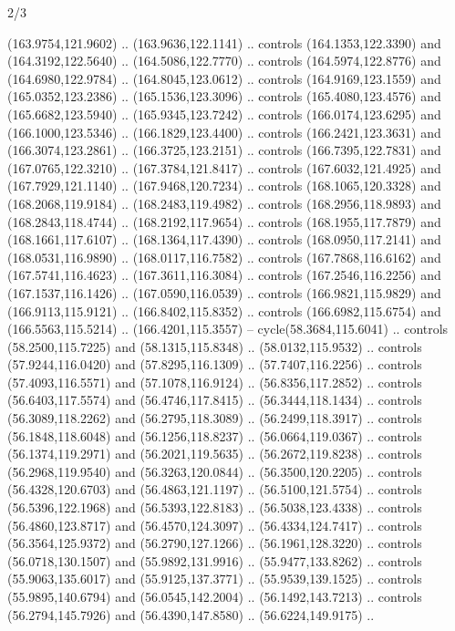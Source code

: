 \begin{flagdescription}{2/3}
\begin{scope}[shift={(0.5\flaglength,0.5)},scale=\flagwidth/320]
\begin{scope}[y=0.8pt, x=0.8pt, yscale=-1,shift={(-118.3,-146)}]
  (163.9754,121.9602) .. (163.9636,122.1141) .. controls (164.1353,122.3390) and
  (164.3192,122.5640) .. (164.5086,122.7770) .. controls (164.5974,122.8776) and
  (164.6980,122.9784) .. (164.8045,123.0612) .. controls (164.9169,123.1559) and
  (165.0352,123.2386) .. (165.1536,123.3096) .. controls (165.4080,123.4576) and
  (165.6682,123.5940) .. (165.9345,123.7242) .. controls (166.0174,123.6295) and
  (166.1000,123.5346) .. (166.1829,123.4400) .. controls (166.2421,123.3631) and
  (166.3074,123.2861) .. (166.3725,123.2151) .. controls (166.7395,122.7831) and
  (167.0765,122.3210) .. (167.3784,121.8417) .. controls (167.6032,121.4925) and
  (167.7929,121.1140) .. (167.9468,120.7234) .. controls (168.1065,120.3328) and
  (168.2068,119.9184) .. (168.2483,119.4982) .. controls (168.2956,118.9893) and
  (168.2843,118.4744) .. (168.2192,117.9654) .. controls (168.1955,117.7879) and
  (168.1661,117.6107) .. (168.1364,117.4390) .. controls (168.0950,117.2141) and
  (168.0531,116.9890) .. (168.0117,116.7582) .. controls (167.7868,116.6162) and
  (167.5741,116.4623) .. (167.3611,116.3084) .. controls (167.2546,116.2256) and
  (167.1537,116.1426) .. (167.0590,116.0539) .. controls (166.9821,115.9829) and
  (166.9113,115.9121) .. (166.8402,115.8352) .. controls (166.6982,115.6754) and
  (166.5563,115.5214) .. (166.4201,115.3557) -- cycle(58.3684,115.6041) ..
  controls (58.2500,115.7225) and (58.1315,115.8348) .. (58.0132,115.9532) ..
  controls (57.9244,116.0420) and (57.8295,116.1309) .. (57.7407,116.2256) ..
  controls (57.4093,116.5571) and (57.1078,116.9124) .. (56.8356,117.2852) ..
  controls (56.6403,117.5574) and (56.4746,117.8415) .. (56.3444,118.1434) ..
  controls (56.3089,118.2262) and (56.2795,118.3089) .. (56.2499,118.3917) ..
  controls (56.1848,118.6048) and (56.1256,118.8237) .. (56.0664,119.0367) ..
  controls (56.1374,119.2971) and (56.2021,119.5635) .. (56.2672,119.8238) ..
  controls (56.2968,119.9540) and (56.3263,120.0844) .. (56.3500,120.2205) ..
  controls (56.4328,120.6703) and (56.4863,121.1197) .. (56.5100,121.5754) ..
  controls (56.5396,122.1968) and (56.5393,122.8183) .. (56.5038,123.4338) ..
  controls (56.4860,123.8717) and (56.4570,124.3097) .. (56.4334,124.7417) ..
  controls (56.3564,125.9372) and (56.2790,127.1266) .. (56.1961,128.3220) ..
  controls (56.0718,130.1507) and (55.9892,131.9916) .. (55.9477,133.8262) ..
  controls (55.9063,135.6017) and (55.9125,137.3771) .. (55.9539,139.1525) ..
  controls (55.9895,140.6794) and (56.0545,142.2004) .. (56.1492,143.7213) ..
  controls (56.2794,145.7926) and (56.4390,147.8580) .. (56.6224,149.9175) ..

\end{scope}
\end{scope}
\end{flagdescription}
